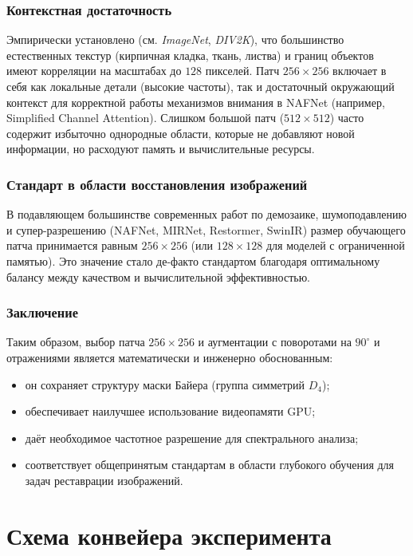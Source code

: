 \documentclass[12pt,a4paper]{article}
\begin{document}
\subsubsection{Контекстная достаточность}
Эмпирически установлено (см. \textit{ImageNet}, \textit{DIV2K}), что большинство естественных текстур (кирпичная кладка, ткань, листва) и границ объектов имеют корреляции на масштабах до $128$ пикселей. Патч $256\times256$ включает в себя как локальные детали (высокие частоты), так и достаточный окружающий контекст для корректной работы механизмов внимания в NAFNet (например, Simplified Channel Attention). Слишком большой патч ($512\times512$) часто содержит избыточно однородные области, которые не добавляют новой информации, но расходуют память и вычислительные ресурсы.

\subsubsection{Стандарт в области восстановления изображений}
В подавляющем большинстве современных работ по демозаике, шумоподавлению и супер-разрешению (NAFNet, MIRNet, Restormer, SwinIR) размер обучающего патча принимается равным $256\times256$ (или $128\times128$ для моделей с ограниченной памятью). Это значение стало де-факто стандартом благодаря оптимальному балансу между качеством и вычислительной эффективностью.

\subsubsection*{Заключение}
Таким образом, выбор патча $256\times256$ и аугментации с поворотами на $90^\circ$ и отражениями является математически и инженерно обоснованным:
\begin{itemize}
    \item он сохраняет структуру маски Байера (группа симметрий $D_4$);
    \item обеспечивает наилучшее использование видеопамяти GPU;
    \item даёт необходимое частотное разрешение для спектрального анализа;
    \item соответствует общепринятым стандартам в области глубокого обучения для задач реставрации изображений.
\end{itemize}


\section{Схема конвейера эксперимента}
\end{document}
